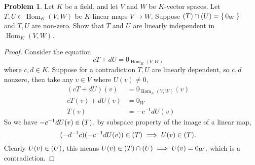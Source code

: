 \documentclass[11pt]{article}
\theoremstyle{definition}
\newtheorem{problem}{Problem}
\numberwithin{lemma}{problem}
\numberwithin{equation}{problem}
\newcommand{\set}[1]{\left\{\,#1\,\right\}}
\DeclareMathOperator{\Hom}{Hom}
\let\Im\relax
\DeclareMathOperator{\Im}{Im}
\begin{document}
\newpage
\begin{problem}
    Let $K$ be a field, and let $V$ and $W$ be $K$-vector spaces.
    Let $T,U \in \Hom_K(V,W)$ be $K$-linear maps $V\to W$.
    Suppose $\Im(T) \cap \Im(U) = \set{0_W}$ and $T,U$ are non-zero.
    Show that $T$ and $U$ are linearly independent in $\Hom_K(V,W)$.
\end{problem}
\begin{proof}
    Consider the equation
    \begin{equation} \label{q3_main}
        c T + d U = 0_{\Hom_K(V,W)}
    \end{equation}
    where $c,d\in K$.
    Suppose for a contradiction $T,U$ are linearly dependent, so $c,d$ nonzero,
    then take any $v\in V$ where $U(v) \ne 0$,
    \begin{align*}
        (c T + d U)(v) &= 0_{\Hom_K(V,W)}(v) \\
        c T(v) + d U(v) &= 0_W   \\
        T(v) &= - c^{-1} d U(v)
    \end{align*}
    So we have $-c^{-1} d U(v) \in \Im(T)$, by subspace property of the image of a linear map,
    $$(-d^{-1} c)(-c^{-1} d U(v)) \in \Im(T) \implies U(v) \in \Im(T).$$
    Clearly $U(v) \in \Im(U)$, this means $U(v) \in \Im(T) \cap \Im(U) \implies U(v) = 0_W$, which is a contradiction.
\end{proof}
\end{document}
